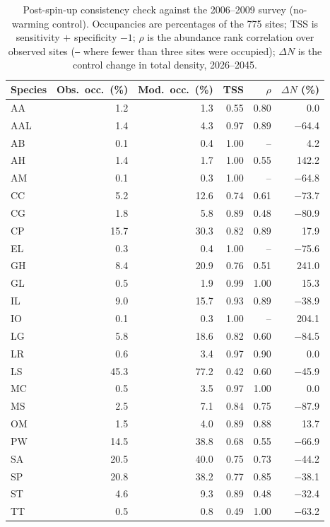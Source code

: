 \documentclass[11pt,a4paper]{article}
\begin{document}
\begin{table}[H]
\centering
\caption{Post-spin-up consistency check against the 2006--2009 survey (no-warming control).
Occupancies are percentages of the 775 sites; TSS is sensitivity $+$ specificity $-1$;
$\rho$ is the abundance rank correlation over observed sites (\texttt{--} where fewer than
three sites were occupied); $\Delta N$ is the control change in total density, 2026--2045.}
\label{tab:validation}
\small
\begin{tabular}{lrrrrr}
\toprule
Species & Obs.\ occ.\ (\%) & Mod.\ occ.\ (\%) & TSS & $\rho$ & $\Delta N$ (\%) \\
\midrule
AA & 1.2 & 1.3 & 0.55 & 0.80 & 0.0 \\
AAL & 1.4 & 4.3 & 0.97 & 0.89 & $-$64.4 \\
AB & 0.1 & 0.4 & 1.00 & -- & 4.2 \\
AH & 1.4 & 1.7 & 1.00 & 0.55 & 142.2 \\
AM & 0.1 & 0.3 & 1.00 & -- & $-$64.8 \\
CC & 5.2 & 12.6 & 0.74 & 0.61 & $-$73.7 \\
CG & 1.8 & 5.8 & 0.89 & 0.48 & $-$80.9 \\
CP & 15.7 & 30.3 & 0.82 & 0.89 & 17.9 \\
EL & 0.3 & 0.4 & 1.00 & -- & $-$75.6 \\
GH & 8.4 & 20.9 & 0.76 & 0.51 & 241.0 \\
GL & 0.5 & 1.9 & 0.99 & 1.00 & 15.3 \\
IL & 9.0 & 15.7 & 0.93 & 0.89 & $-$38.9 \\
IO & 0.1 & 0.3 & 1.00 & -- & 204.1 \\
LG & 5.8 & 18.6 & 0.82 & 0.60 & $-$84.5 \\
LR & 0.6 & 3.4 & 0.97 & 0.90 & 0.0 \\
LS & 45.3 & 77.2 & 0.42 & 0.60 & $-$45.9 \\
MC & 0.5 & 3.5 & 0.97 & 1.00 & 0.0 \\
MS & 2.5 & 7.1 & 0.84 & 0.75 & $-$87.9 \\
OM & 1.5 & 4.0 & 0.89 & 0.88 & 13.7 \\
PW & 14.5 & 38.8 & 0.68 & 0.55 & $-$66.9 \\
SA & 20.5 & 40.0 & 0.75 & 0.73 & $-$44.2 \\
SP & 20.8 & 38.2 & 0.77 & 0.85 & $-$38.1 \\
ST & 4.6 & 9.3 & 0.89 & 0.48 & $-$32.4 \\
TT & 0.5 & 0.8 & 0.49 & 1.00 & $-$63.2 \\
\bottomrule
\end{tabular}
\end{table}
\end{document}
